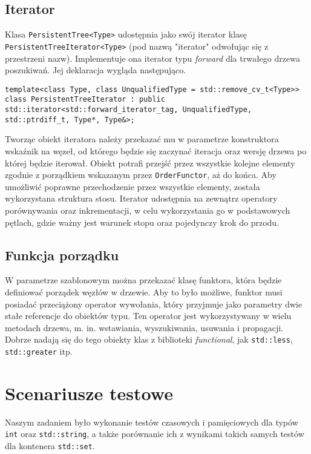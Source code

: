 \documentclass[a4paper,twoside]{article}
\begin{document}
	\subsection{Iterator}
	Klasa \lstinline|PersistentTree<Type>| udostępnia jako swój iterator klasę \lstinline|PersistentTreeIterator<Type>| (pod nazwą "iterator" odwołując się z przestrzeni nazw). Implementuje ona iterator typu \textit{forward} dla trwałego drzewa poszukiwań. Jej deklaracja wygląda następująco.
	\begin{lstlisting}[caption=PersistentTreeIterator]
template<class Type, class UnqualifiedType = std::remove_cv_t<Type>>
class PersistentTreeIterator : public std::iterator<std::forward_iterator_tag, UnqualifiedType, std::ptrdiff_t, Type*, Type&>;
	\end{lstlisting}
	Tworząc obiekt iteratora należy przekazać mu w parametrze konstruktora wskaźnik na węzeł, od którego będzie się zaczynać iteracja oraz wersję drzewa po której będzie iterował. Obiekt potrafi przejść przez wszystkie kolejne elementy zgodnie z porządkiem wskazanym przez \lstinline|OrderFunctor|, aż do końca. Aby umożliwić poprawne przechodzenie przez wszystkie elementy, została wykorzystana struktura stosu. Iterator udostępnia na zewnątrz operatory porównywania oraz inkrementacji, w celu wykorzystania go w podstawowych pętlach, gdzie ważny jest warunek stopu oraz pojedynczy krok do przodu.
	\subsection{Funkcja porządku}
	W parametrze szablonowym można przekazać klasę funktora, która będzie definiować porządek węzłów w drzewie. Aby to było możliwe, funktor musi posiadać przeciążony operator wywołania, który przyjmuje jako parametry dwie stałe referencje do obiektów typu. Ten operator jest wykorzystywany w wielu metodach drzewa, m. in. wstawiania, wyszukiwania, usuwania i propagacji. Dobrze nadają się do tego obiekty klas z biblioteki \textit{functional}, jak \lstinline|std::less|, \lstinline|std::greater| itp.
	
	\section{Scenariusze testowe}
	Naszym zadaniem było wykonanie testów czasowych i pamięciowych dla typów \lstinline|int| oraz \lstinline|std::string|, a także porównanie ich z wynikami takich samych testów dla kontenera \lstinline|std::set|.
\end{document}
